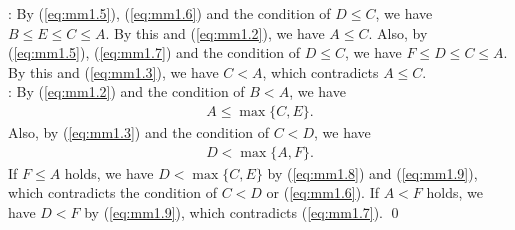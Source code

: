 \documentclass[a4paper]{llncs}
\begin{document}
\noindent
[Case 2]: By (\ref{eq:mm1.5}), (\ref{eq:mm1.6}) and the condition of $D \le C$, we have $B \le E \le C \le A$.
By this and (\ref{eq:mm1.2}), we have $A \le C$.
Also, by (\ref{eq:mm1.5}), (\ref{eq:mm1.7}) and the condition of $D \le C$, we have $F \le D \le C \le A$.
By this and (\ref{eq:mm1.3}), we have $C < A$, which contradicts $A \le C$.\\
\noindent
[Case 3]: By (\ref{eq:mm1.2}) and the condition of $B < A$, we have 
\begin{eqnarray}
A \le \max \{ C, E \}. \label{eq:mm1.8}
\end{eqnarray}
Also, by (\ref{eq:mm1.3}) and the condition of $C < D$, we have
\begin{eqnarray}
D < \max \{ A, F \}. \label{eq:mm1.9}
\end{eqnarray}
If $F \le A$ holds, we have $D < \max \{ C, E \}$ by (\ref{eq:mm1.8}) and (\ref{eq:mm1.9}), which contradicts the condition of $C < D$ or (\ref{eq:mm1.6}).
If $A < F$ holds, we have $D < F$ by (\ref{eq:mm1.9}), which contradicts (\ref{eq:mm1.7}).
\qed
\end{document}
